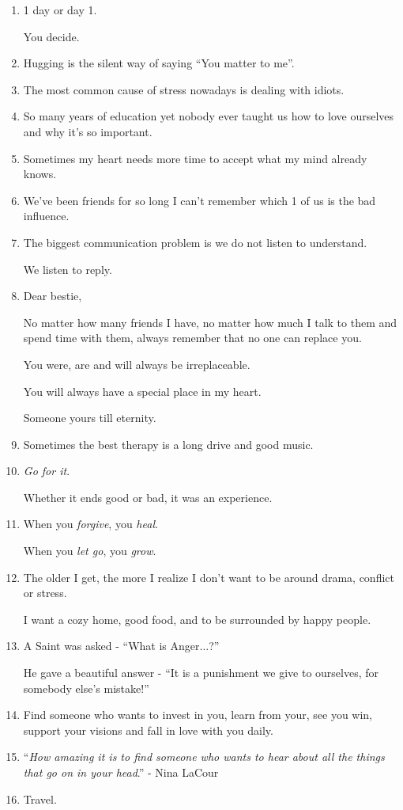 \documentclass{article}
\numberwithin{equation}{section}
\begin{document}
\begin{enumerate}
    Me neither.
    \item 1 day or day 1.
    
    You decide.
    \item Hugging is the silent way of saying ``You matter to me''.
    \item The most common cause of stress nowadays is dealing with idiots.
    \item So many years of education yet nobody ever taught us how to love ourselves and why it's so important.
    \item Sometimes my heart needs more time to accept what my mind already knows.
    \item We've been friends for so long I can't remember which 1 of us is the bad influence.
    \item The biggest communication problem is we do not listen to understand.
    
    We listen to reply.
    \item Dear bestie,
    
    No matter how many friends I have, no matter how much I talk to them and spend time with them, always remember that no one can replace you.
    
    You were, are and will always be irreplaceable.
    
    You will always have a special place in my heart.
    
    Someone yours till eternity.
    \item Sometimes the best therapy is a long drive and good music.
    \item \textit{Go for it}.
    
    Whether it ends good or bad, it was an experience.
    \item When you \textit{forgive}, you \textit{heal}.
    
    When you \textit{let go}, you \textit{grow}.
    \item The older I get, the more I realize I don't want to be around drama, conflict or stress.
    
    I want a cozy home, good food, and to be surrounded by happy people.
    \item A Saint was asked - ``What is Anger$\ldots$?''
    
    He gave a beautiful answer - ``It is a punishment we give to ourselves, for somebody else's mistake!''
    \item Find someone who wants to invest in you, learn from your, see you win, support your visions and fall in love with you daily.
    \item ``\textit{How amazing it is to find someone who wants to hear about all the things that go on in your head}.'' - Nina LaCour
    \item Travel.
    

\end{enumerate}
\end{document}
